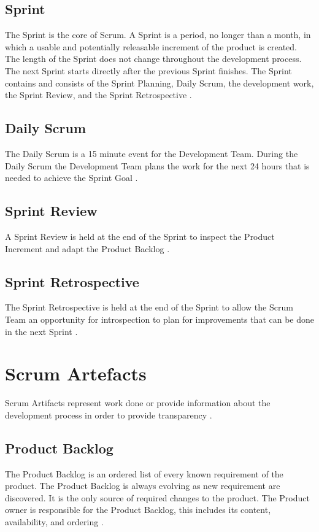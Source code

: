 \subsection{Sprint}
The Sprint is the core of Scrum. A Sprint is a period, no longer than a month, in which 
a usable and potentially releasable increment of the product is created. The length
of the Sprint does not change throughout the development process. The next Sprint 
starts directly after the previous Sprint finishes. The Sprint contains and consists of the 
Sprint Planning, Daily Scrum, the development work, the Sprint Review, and the 
Sprint Retrospective \parencite{TheScrumGuide}.

\subsection{Daily Scrum}
The Daily Scrum is a 15 minute event for the Development Team. During the Daily 
Scrum the Development Team plans the work for the next 24 hours that is needed
to achieve the Sprint Goal  \parencite{TheScrumGuide}.

\subsection{Sprint Review}
A Sprint Review is held at the end of the Sprint to inspect the Product Increment 
and adapt the Product Backlog  \parencite{TheScrumGuide}.

\subsection{Sprint Retrospective}
The Sprint Retrospective is held at the end of the Sprint to allow the Scrum Team
an opportunity for introspection to plan for improvements that can be 
done in the next Sprint  \parencite{TheScrumGuide}.

\section{Scrum Artefacts}
Scrum Artifacts represent work done or provide information about the development 
process in order to provide transparency \parencite{TheScrumGuide}.

\subsection{Product Backlog}
The Product Backlog is an ordered list of every known requirement of the product.
The Product Backlog is always evolving as new requirement are discovered. It is 
the only source of required changes to the product. The Product owner is 
responsible for the Product Backlog, this includes its content, availability, 
and ordering \parencite{TheScrumGuide}.


